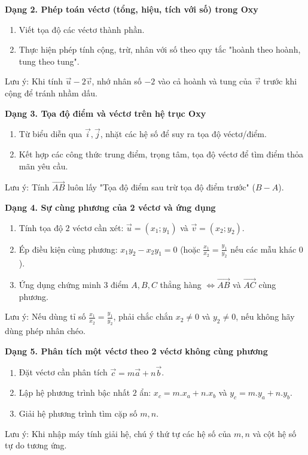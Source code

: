 \textbf{Dạng 2. Phép toán véctơ (tổng, hiệu, tích với số) trong Oxy}
\begin{enumerate}
\item Viết tọa độ các véctơ thành phần.
\item Thực hiện phép tính cộng, trừ, nhân với số theo quy tắc "hoành theo hoành, tung theo tung".
\end{enumerate}
Lưu ý: Khi tính $\overrightarrow{u} - 2\overrightarrow{v}$, nhớ nhân số $-2$ vào cả hoành và tung của $\overrightarrow{v}$ trước khi cộng để tránh nhầm dấu.

\textbf{Dạng 3. Tọa độ điểm và véctơ trên hệ trục Oxy}
\begin{enumerate}
\item Từ biểu diễn qua $\overrightarrow{i}, \overrightarrow{j}$, nhặt các hệ số để suy ra tọa độ véctơ/điểm.
\item Kết hợp các công thức trung điểm, trọng tâm, tọa độ véctơ để tìm điểm thỏa mãn yêu cầu.
\end{enumerate}
Lưu ý: Tính $\overrightarrow{AB}$ luôn lấy "Tọa độ điểm sau trừ tọa độ điểm trước" ($B - A$).

\textbf{Dạng 4. Sự cùng phương của 2 véctơ và ứng dụng}
\begin{enumerate}
\item Tính tọa độ $2$ véctơ cần xét: $\overrightarrow{u} = (x_1; y_1)$ và $\overrightarrow{v} = (x_2; y_2)$.
\item Ép điều kiện cùng phương: $x_1 y_2 - x_2 y_1 = 0$ (hoặc $\frac{x_1}{x_2} = \frac{y_1}{y_2}$ nếu các mẫu khác $0$).
\item Ứng dụng chứng minh $3$ điểm $A, B, C$ thẳng hàng $\Leftrightarrow \overrightarrow{AB}$ và $\overrightarrow{AC}$ cùng phương.
\end{enumerate}
Lưu ý: Nếu dùng tỉ số $\frac{x_1}{x_2} = \frac{y_1}{y_2}$, phải chắc chắn $x_2 \neq 0$ và $y_2 \neq 0$, nếu không hãy dùng phép nhân chéo.

\textbf{Dạng 5. Phân tích một véctơ theo 2 véctơ không cùng phương}
\begin{enumerate}
\item Đặt véctơ cần phân tích $\overrightarrow{c} = m\overrightarrow{a} + n\overrightarrow{b}$.
\item Lập hệ phương trình bậc nhất $2$ ẩn: $x_c = m.x_a + n.x_b$ và $y_c = m.y_a + n.y_b$.
\item Giải hệ phương trình tìm cặp số $m, n$.
\end{enumerate}
Lưu ý: Khi nhập máy tính giải hệ, chú ý thứ tự các hệ số của $m, n$ và cột hệ số tự do tương ứng.

